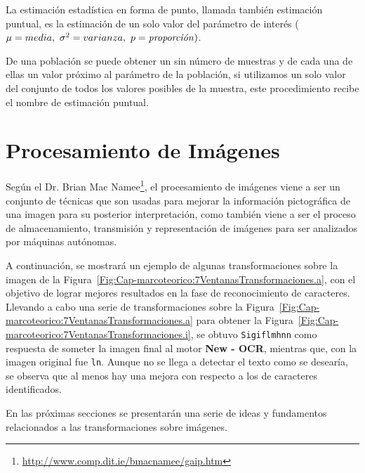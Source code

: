	\begin{defn}
  La estimación estadística en forma de punto, llamada también estimación 
  puntual, es la estimación de un solo valor del parámetro de interés 
  ($\mu = media,~ \sigma^2 = varianza,~ p=\text{\textit{proporción}})$.
    
  De una población se puede obtener un sin número de muestras y de cada una 
  de ellas un valor próximo al parámetro de la población, si utilizamos un 
  solo valor del conjunto de todos los valores posibles de la muestra, este 
  procedimiento recibe el nombre de estimación puntual.
  \end{defn}

\section{Procesamiento de Imágenes}
\label{sec:procesamiento-imagenes}
Según el Dr. Brian Mac Namee\footnote{\url{http://www.comp.dit.ie/bmacnamee/gaip.htm}}, 
el procesamiento de imágenes viene a ser un 
conjunto de técnicas que son usadas para mejorar la información pictográfica 
de una imagen para su posterior interpretación, como también viene a ser el 
proceso de almacenamiento, transmisión y representación de imágenes para ser 
analizados por máquinas autónomas.

A continuación, se mostrará un ejemplo de algunas transformaciones sobre la 
imagen de la Figura~\ref{Fig:Cap-marcoteorico:7VentanasTransformaciones.a}, 
con el objetivo de lograr mejores resultados en la fase de reconocimiento de 
caracteres. Llevando a cabo una serie de transformaciones sobre la 
Figura~\ref{Fig:Cap-marcoteorico:7VentanasTransformaciones.a} para obtener 
la Figura~\ref{Fig:Cap-marcoteorico:7VentanasTransformaciones.i}, se obtuvo 
\texttt{Sigiflmhnn} como respuesta de someter la imagen final al motor 
\textbf{New - OCR}, mientras que, con la imagen original fue \texttt{ln}. 
Aunque no se llega a detectar el texto como se desearía, se observa que al 
menos hay una mejora con respecto a los de caracteres identificados.

En las próximas secciones se presentarán una serie de ideas y fundamentos 
relacionados a las transformaciones sobre imágenes.


